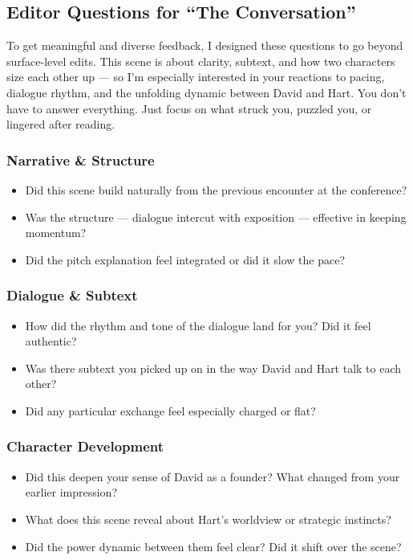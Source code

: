 \subsection{Editor Questions for ``The Conversation''}

To get meaningful and diverse feedback, I designed these questions to go beyond surface-level edits.  
This scene is about clarity, subtext, and how two characters size each other up — so I’m especially interested in your reactions to pacing, dialogue rhythm, and the unfolding dynamic between David and Hart. You don’t have to answer everything. Just focus on what struck you, puzzled you, or lingered after reading.

\subsubsection{Narrative \& Structure}

\begin{itemize}
  \item Did this scene build naturally from the previous encounter at the conference?
  \item Was the structure — dialogue intercut with exposition — effective in keeping momentum?
  \item Did the pitch explanation feel integrated or did it slow the pace?
\end{itemize}

\subsubsection{Dialogue \& Subtext}

\begin{itemize}
  \item How did the rhythm and tone of the dialogue land for you? Did it feel authentic?
  \item Was there subtext you picked up on in the way David and Hart talk to each other?
  \item Did any particular exchange feel especially charged or flat?
\end{itemize}

\subsubsection{Character Development}

\begin{itemize}
  \item Did this deepen your sense of David as a founder? What changed from your earlier impression?
  \item What does this scene reveal about Hart’s worldview or strategic instincts?
  \item Did the power dynamic between them feel clear? Did it shift over the scene?
\end{itemize}

